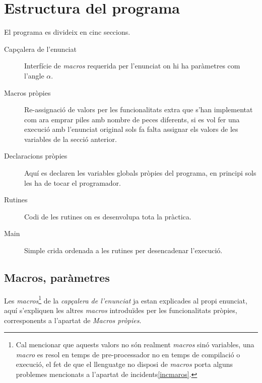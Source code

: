 \section{Estructura del programa}
El programa es divideix en cinc seccions.

\begin{description}
\item [Capçalera de l'enunciat] Interfície de \emph{macros} requerida
per l'enunciat on hi ha paràmetres com l'angle $\alpha$.

\item [Macros pròpies] Re-assignació de valors per les funcionalitats extra que
s'han implementat com ara emprar piles amb nombre de peces diferents, si es vol
fer una execució amb l'enunciat original sols fa falta assignar els valors de
les variables de la secció anterior.

\item [Declaracions pròpies] Aquí es declaren les variables globals pròpies
del programa, en principi sols les ha de tocar el programador.

\item [Rutines] Codi de les rutines on es desenvolupa tota la pràctica.

\item [Main] Simple crida ordenada a les rutines per desencadenar l'execució.
\end{description}

\subsection{Macros, paràmetres}
Les \emph{macros}\footnote{Cal mencionar que aquests valors no són realment
\emph{macros} sinó variables, una \emph{macro} es resol en temps de
pre-processador no en temps de compilació o execució, el fet de que el
llenguatge no disposi de \emph{macros} porta alguns problemes mencionats
a l'apartat de incidents\ref{incmaros}.} de la \emph{capçalera de l'enunciat} 
ja estan explicades al propi enunciat, aquí s'expliquen les altres
\emph{macros} introduïdes per les funcionalitats pròpies, corresponents a
l'apartat de \emph{Macros pròpies}.

